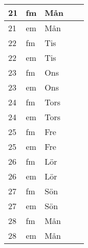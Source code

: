 \documentclass[a4paper]{article}
\begin{document}
\begin{table}[ht!]
\begin{tabular}{lllp{7cm}p{7cm}}
\multicolumn{1}{|l|}{21} & \multicolumn{1}{l|}{fm} & \multicolumn{1}{l|}{Mån} & \multicolumn{1}{l|}{} & \multicolumn{1}{l|}{} \\ \hline
\multicolumn{1}{|l|}{21} & \multicolumn{1}{l|}{em} & \multicolumn{1}{l|}{Mån} & \multicolumn{1}{l|}{} & \multicolumn{1}{l|}{} \\ \hline    

\multicolumn{1}{|l|}{22} & \multicolumn{1}{l|}{fm} & \multicolumn{1}{l|}{Tis} & \multicolumn{1}{l|}{} & \multicolumn{1}{l|}{} \\ \hline
\multicolumn{1}{|l|}{22} & \multicolumn{1}{l|}{em} & \multicolumn{1}{l|}{Tis} & \multicolumn{1}{l|}{} & \multicolumn{1}{l|}{} \\ \hline    

\multicolumn{1}{|l|}{23} & \multicolumn{1}{l|}{fm} & \multicolumn{1}{l|}{Ons} & \multicolumn{1}{l|}{} & \multicolumn{1}{l|}{} \\ \hline
\multicolumn{1}{|l|}{23} & \multicolumn{1}{l|}{em} & \multicolumn{1}{l|}{Ons} & \multicolumn{1}{l|}{} & \multicolumn{1}{l|}{} \\ \hline    

\multicolumn{1}{|l|}{24} & \multicolumn{1}{l|}{fm} & \multicolumn{1}{l|}{Tors} & \multicolumn{1}{l|}{} & \multicolumn{1}{l|}{} \\ \hline
\multicolumn{1}{|l|}{24} & \multicolumn{1}{l|}{em} & \multicolumn{1}{l|}{Tors} & \multicolumn{1}{l|}{} & \multicolumn{1}{l|}{} \\ \hline    

\multicolumn{1}{|l|}{25} & \multicolumn{1}{l|}{fm} & \multicolumn{1}{l|}{Fre} & \multicolumn{1}{l|}{} & \multicolumn{1}{l|}{} \\ \hline
\multicolumn{1}{|l|}{25} & \multicolumn{1}{l|}{em} & \multicolumn{1}{l|}{Fre} & \multicolumn{1}{l|}{} & \multicolumn{1}{l|}{} \\ \hline    

\multicolumn{1}{|l|}{26} & \multicolumn{1}{l|}{fm} & \multicolumn{1}{l|}{Lör} & \multicolumn{1}{l|}{} & \multicolumn{1}{l|}{} \\ \hline
\multicolumn{1}{|l|}{26} & \multicolumn{1}{l|}{em} & \multicolumn{1}{l|}{Lör} & \multicolumn{1}{l|}{} & \multicolumn{1}{l|}{} \\ \hline    

\multicolumn{1}{|l|}{27} & \multicolumn{1}{l|}{fm} & \multicolumn{1}{l|}{Sön} & \multicolumn{1}{l|}{} & \multicolumn{1}{l|}{} \\ \hline
\multicolumn{1}{|l|}{27} & \multicolumn{1}{l|}{em} & \multicolumn{1}{l|}{Sön} & \multicolumn{1}{l|}{} & \multicolumn{1}{l|}{} \\ \hline    

\multicolumn{1}{|l|}{28} & \multicolumn{1}{l|}{fm} & \multicolumn{1}{l|}{Mån} & \multicolumn{1}{l|}{} & \multicolumn{1}{l|}{} \\ \hline
\multicolumn{1}{|l|}{28} & \multicolumn{1}{l|}{em} & \multicolumn{1}{l|}{Mån} & \multicolumn{1}{l|}{} & \multicolumn{1}{l|}{} \\ \hline    

    \end{tabular}
    \end{table}
    
\end{document}
